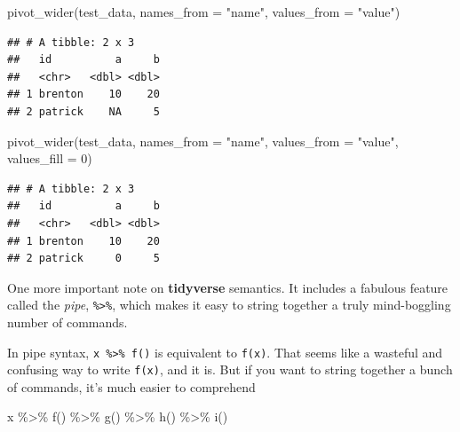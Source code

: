 \documentclass[
  12pt,
  oneside,openany]{book}
\newenvironment{Shaded}{\begin{snugshade}}{\end{snugshade}}
\newcommand{\AttributeTok}[1]{\textcolor[rgb]{0.77,0.63,0.00}{#1}}
\newcommand{\DecValTok}[1]{\textcolor[rgb]{0.00,0.00,0.81}{#1}}
\newcommand{\FunctionTok}[1]{\textcolor[rgb]{0.00,0.00,0.00}{#1}}
\newcommand{\NormalTok}[1]{#1}
\newcommand{\SpecialCharTok}[1]{\textcolor[rgb]{0.00,0.00,0.00}{#1}}
\newcommand{\StringTok}[1]{\textcolor[rgb]{0.31,0.60,0.02}{#1}}
\begin{document}
\begin{Shaded}
\begin{Highlighting}[]
\FunctionTok{pivot\_wider}\NormalTok{(test\_data, }\AttributeTok{names\_from =} \StringTok{"name"}\NormalTok{, }\AttributeTok{values\_from =} \StringTok{"value"}\NormalTok{)}
\end{Highlighting}
\end{Shaded}

\begin{verbatim}
## # A tibble: 2 x 3
##   id          a     b
##   <chr>   <dbl> <dbl>
## 1 brenton    10    20
## 2 patrick    NA     5
\end{verbatim}

\begin{Shaded}
\begin{Highlighting}[]
\FunctionTok{pivot\_wider}\NormalTok{(test\_data, }\AttributeTok{names\_from =} \StringTok{"name"}\NormalTok{, }\AttributeTok{values\_from =} \StringTok{"value"}\NormalTok{, }\AttributeTok{values\_fill =} \DecValTok{0}\NormalTok{)}
\end{Highlighting}
\end{Shaded}

\begin{verbatim}
## # A tibble: 2 x 3
##   id          a     b
##   <chr>   <dbl> <dbl>
## 1 brenton    10    20
## 2 patrick     0     5
\end{verbatim}

One more important note on \textbf{tidyverse} semantics. It includes a fabulous feature called the \emph{pipe}, \texttt{\%\textgreater{}\%}, which makes it easy to string together a truly mind-boggling number of commands.

In pipe syntax, \texttt{x\ \%\textgreater{}\%\ f()} is equivalent to \texttt{f(x)}. That seems like a wasteful and confusing way to write \texttt{f(x)}, and it is. But if you want to string together a bunch of commands, it's much easier to comprehend

\begin{Shaded}
\begin{Highlighting}[]
\NormalTok{x }\SpecialCharTok{\%\textgreater{}\%}
  \FunctionTok{f}\NormalTok{() }\SpecialCharTok{\%\textgreater{}\%}
  \FunctionTok{g}\NormalTok{() }\SpecialCharTok{\%\textgreater{}\%}
  \FunctionTok{h}\NormalTok{() }\SpecialCharTok{\%\textgreater{}\%}
  \FunctionTok{i}\NormalTok{()}
\end{Highlighting}
\end{Shaded}
\end{document}
